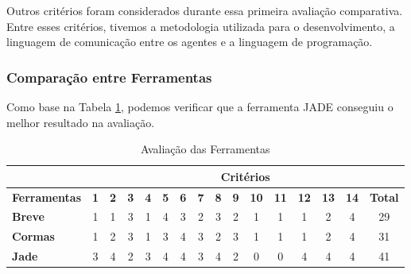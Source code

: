 Outros critérios foram considerados durante essa primeira avaliação comparativa. Entre esses critérios, tivemos a metodologia utilizada para o desenvolvimento, a linguagem de comunicação entre os agentes e a linguagem de programação.  
 
\subsubsection{Compara\c{c}\~ao entre Ferramentas}

Como base na Tabela \ref{tab:CompFerramSMAs}, podemos verificar que a ferramenta JADE conseguiu o melhor resultado na avaliação.

\begin{table}[htb!]
\caption{Avaliação das Ferramentas} \label{tab:CompFerramSMAs}
\begin{tabular}{|l|l|l|l|l|l|l|l|l|l|l|l|l|l|l|l|}
\cline{2-16}
\multicolumn{1}{c|}{} & \multicolumn{15}{c|}{\textbf{Critérios}} \\ 
\hline
\textbf{Ferramentas} & \textbf{1} & \textbf{2} & \textbf{3} & \textbf{4} & \textbf{5} & \textbf{6} & \textbf{7} & \textbf{8} & \textbf{9} & \textbf{10} & \textbf{11} & \textbf{12} & \textbf{13} & \textbf{14} & \textbf{Total} \\ 
\hline
\textbf{Breve} & \multicolumn{1}{c|}{1} & \multicolumn{1}{c|}{1} & \multicolumn{1}{c|}{3} & \multicolumn{1}{c|}{1} & \multicolumn{1}{c|}{4} & \multicolumn{1}{c|}{3} & \multicolumn{1}{c|}{2} & \multicolumn{1}{c|}{3} & \multicolumn{1}{c|}{2} & \multicolumn{1}{c|}{1} & \multicolumn{1}{c|}{1} & \multicolumn{1}{c|}{1} & \multicolumn{1}{c|}{2} & \multicolumn{1}{c|}{4} & \multicolumn{1}{c|}{29} \\ 
\hline
\textbf{Cormas} & \multicolumn{1}{c|}{1} & \multicolumn{1}{c|}{2} & \multicolumn{1}{c|}{3} & \multicolumn{1}{c|}{1} & \multicolumn{1}{c|}{3} & \multicolumn{1}{c|}{4} & \multicolumn{1}{c|}{3} & \multicolumn{1}{c|}{2} & \multicolumn{1}{c|}{3} & \multicolumn{1}{c|}{1} & \multicolumn{1}{c|}{1} & \multicolumn{1}{c|}{1} & \multicolumn{1}{c|}{2} & \multicolumn{1}{c|}{4} & \multicolumn{1}{c|}{31} \\ 
\hline
\textbf{Jade} & \multicolumn{1}{c|}{3} & \multicolumn{1}{c|}{4} & \multicolumn{1}{c|}{2} & \multicolumn{1}{c|}{3} & \multicolumn{1}{c|}{4} & \multicolumn{1}{c|}{4} & \multicolumn{1}{c|}{3} & \multicolumn{1}{c|}{4} & \multicolumn{1}{c|}{2} & \multicolumn{1}{c|}{0} & \multicolumn{1}{c|}{0} & \multicolumn{1}{c|}{4} & \multicolumn{1}{c|}{4} & \multicolumn{1}{c|}{4} & \multicolumn{1}{c|}{41} \\ 

\end{tabular}
\end{table}
